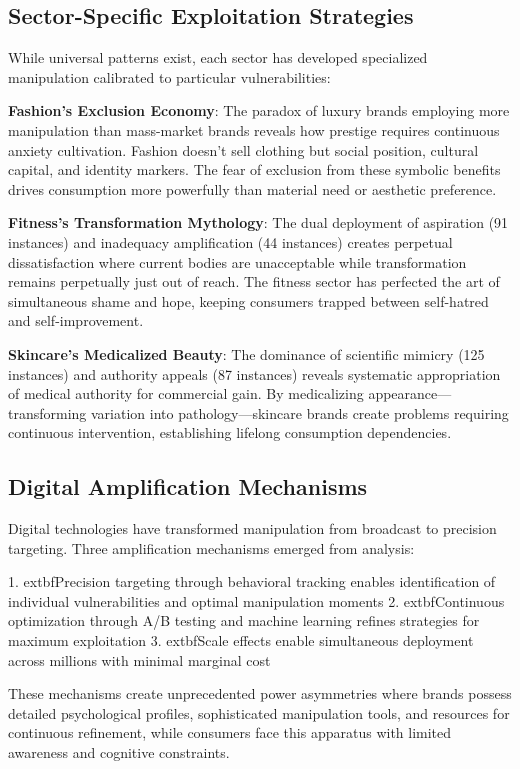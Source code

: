 \subsection{Sector-Specific Exploitation Strategies}

While universal patterns exist, each sector has developed specialized manipulation calibrated to particular vulnerabilities:

\textbf{Fashion's Exclusion Economy}: The paradox of luxury brands employing more manipulation than mass-market brands reveals how prestige requires continuous anxiety cultivation. Fashion doesn't sell clothing but social position, cultural capital, and identity markers. The fear of exclusion from these symbolic benefits drives consumption more powerfully than material need or aesthetic preference.

\textbf{Fitness's Transformation Mythology}: The dual deployment of aspiration (91 instances) and inadequacy amplification (44 instances) creates perpetual dissatisfaction where current bodies are unacceptable while transformation remains perpetually just out of reach. The fitness sector has perfected the art of simultaneous shame and hope, keeping consumers trapped between self-hatred and self-improvement.

\textbf{Skincare's Medicalized Beauty}: The dominance of scientific mimicry (125 instances) and authority appeals (87 instances) reveals systematic appropriation of medical authority for commercial gain. By medicalizing appearance—transforming variation into pathology—skincare brands create problems requiring continuous intervention, establishing lifelong consumption dependencies.

\subsection{Digital Amplification Mechanisms}

Digital technologies have transformed manipulation from broadcast to precision targeting. Three amplification mechanisms emerged from analysis:

1. 	extbf{Precision targeting} through behavioral tracking enables identification of individual vulnerabilities and optimal manipulation moments
2. 	extbf{Continuous optimization} through A/B testing and machine learning refines strategies for maximum exploitation
3. 	extbf{Scale effects} enable simultaneous deployment across millions with minimal marginal cost

These mechanisms create unprecedented power asymmetries where brands possess detailed psychological profiles, sophisticated manipulation tools, and resources for continuous refinement, while consumers face this apparatus with limited awareness and cognitive constraints.

